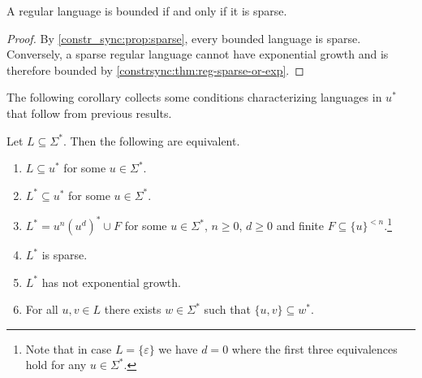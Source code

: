 \begin{corollary} \label{constr_sync:thm:cf_bounded_equals_sparse}
	A regular language is bounded if and only if it is sparse.
\end{corollary} 
\begin{proof}
	By \cref{constr_sync:prop:sparse}, every bounded language is sparse. Conversely, a sparse regular language cannot have exponential growth and is therefore bounded by \cref{constrsync:thm:reg-sparse-or-exp}.	
\end{proof}

The following corollary collects some conditions characterizing languages
in $u^*$ that follow from previous results.

\begin{corollary}
	\label{constr_sync:cor:kleene_star_growth}
	Let $L \subseteq \Sigma^*$. Then the following are equivalent.	
\end{corollary}
\begin{enumerate}	
	\item \label{constrsync:cor:kleenestar:item:Lustar} $L \subseteq u^*$ for some $u \in \Sigma^*$.	
	
	\item \label{constrsync:cor:kleenestar:item:Lstarustar} $L^* \subseteq u^*$ for some $u \in \Sigma^*$.
	
	\item \label{constrsync:cor:kleenestar:item:regular} $L^* = u^n(u^d)^* \cup F$ for some $u \in \Sigma^*$, $n \ge 0$, $d \ge 0$ and finite $F \subseteq \{ u \}^{< n}$.\footnote{Note that in case $L = \{\varepsilon\}$ we 
		have $d = 0$ where the first three equivalences hold for any $u \in \Sigma^*$.}
	
	\item \label{constrsync:cor:kleenestar:item:sparse} $L^*$ is sparse.
	
	\item \label{constrsync:cor:kleenestar:item:notexponential} $L^*$ has not exponential growth.
	
	\item \label{constrsync:cor:kleenestar:item:vu} For all $u,v \in L$ there exists $w \in \Sigma^*$ 
	such that $\{u, v\} \subseteq w^*$.
\end{enumerate}

